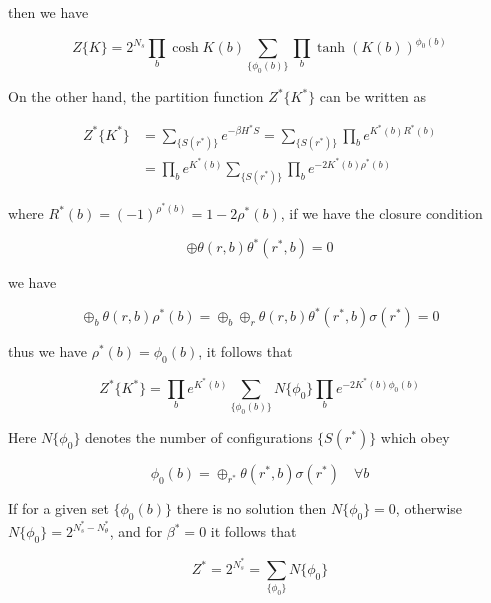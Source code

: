 \documentclass[11pt]{article}
\begin{document}
then we have

\begin{equation}
    Z\{K\} = 2^{N_s} \prod_b\cosh{K(b)} \sum_{\{\phi_0(b)\}} \prod_b \tanh(K(b))^{\phi_0(b)}
\end{equation}

On the other hand, the partition function $Z^{*}\{K^{*}\}$ can be written as

\begin{equation}
    \begin{aligned}
        Z^{*}\{K^{*}\} &= \sum_{\{S(r^*)\}} e^{-\beta H^*{S}} = \sum_{\{S(r^*)\}} \prod_b e^{K^*(b)R^*(b)}\\
        &=\prod_b e^{K^{*}(b)}\sum_{\{S(r^*)\}}\prod_b e^{-2K^*(b)\rho^*(b)}
    \end{aligned}
\end{equation}

where $R^{*}(b) = (-1)^{\rho^*(b)} = 1 - 2\rho^*(b)$, if we have the closure condition

\begin{equation}
    \oplus\theta(r, b)\theta^{*}(r^{*}, b) = 0
\end{equation}

we have

\begin{equation}
    \oplus_b \theta(r, b)\rho^{*}(b) = \oplus_b\oplus_r \theta(r, b)\theta^{*}(r^*, b)\sigma(r^*) = 0
\end{equation}

thus we have $\rho^*(b) = \phi_0(b)$, it follows that

\begin{equation}
    Z^{*}\{K^*\} = \prod_b e^{K^{*}(b)} \sum_{\{\phi_0(b)\}} N\{\phi_0\} \prod_b e^{-2K^{*}(b)\phi_0(b)}
\end{equation}

Here $N\{\phi_0\}$ denotes the number of configurations $\{S(r^*)\}$ which obey

\begin{equation}
    \phi_0(b) = \oplus_{r^*} \theta(r^{*}, b)\sigma(r^{*})\quad \forall b
\end{equation}

If for a given set $\{\phi_0(b)\}$ there is no solution then $N\{\phi_0\} = 0$,
otherwise $N\{\phi_0\} = 2^{N_s^* - N_{\theta}^*}$, and for $\beta^* = 0$ it follows
that

\begin{equation}
    Z^{*} = 2^{N_s^*} = \sum_{\{\phi_0\}} N\{\phi_0\}
\end{equation}
\end{document}
